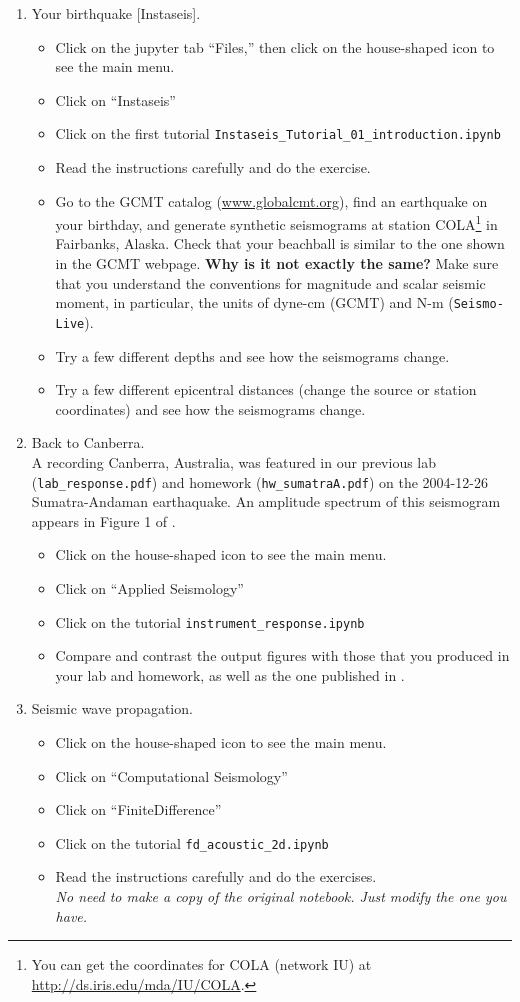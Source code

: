 \documentclass[11pt,titlepage,fleqn]{article}
\newcommand{\slive}{{\tt Seismo-Live}}
\begin{document}
\begin{enumerate}
\item Your birthquake [Instaseis].
\begin{itemize}
\item Click on the jupyter tab ``Files,'' then click on the house-shaped icon to see the main menu.
\item Click on ``Instaseis''
\item Click on the first tutorial \verb+Instaseis_Tutorial_01_introduction.ipynb+
\item Read the instructions carefully and do the exercise.
\item Go to the GCMT catalog (\url{www.globalcmt.org}), find an earthquake on your birthday, and generate synthetic seismograms at station COLA\footnote{You can get the coordinates for COLA (network IU) at \url{http://ds.iris.edu/mda/IU/COLA}.} in Fairbanks, Alaska. Check that your beachball is similar to the one shown in the GCMT webpage. {\bf Why is it not exactly the same?} Make sure that you understand the conventions for magnitude and scalar seismic moment, in particular, the units of dyne-cm (GCMT) and N-m (\slive).
\item Try a few different depths and see how the seismograms change.
\item Try a few different epicentral distances (change the source or station coordinates) and see how the seismograms change.
\end{itemize}

\item Back to Canberra. \\
A recording Canberra, Australia, was featured in our previous lab (\verb+lab_response.pdf+) and homework (\verb+hw_sumatraA.pdf+) on the 2004-12-26  Sumatra-Andaman earthaquake. An amplitude spectrum of this seismogram appears in Figure 1 of \citet{Park2005}.
\begin{itemize}
\item Click on the house-shaped icon to see the main menu.
\item Click on ``Applied Seismology''
\item Click on the tutorial \verb+instrument_response.ipynb+
\item Compare and contrast the output figures with those that you produced in your lab and homework, as well as the one published in \citet{Park2005}.
\end{itemize}

\item Seismic wave propagation.
\begin{itemize}
\item Click on the house-shaped icon to see the main menu.
\item Click on ``Computational Seismology''
\item Click on ``FiniteDifference''
\item Click on the tutorial \verb+fd_acoustic_2d.ipynb+
\item Read the instructions carefully and do the exercises. \\
{\em No need to make a copy of the original notebook. Just modify the one you have.}
\end{itemize}


\end{enumerate}
\end{document}
